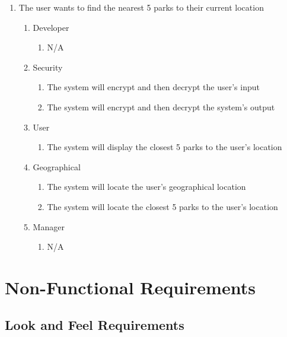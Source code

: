 \documentclass[titlepage]{article}
\begin{document}
\begin{enumerate}[{BE}1.]
    \item The user wants to find the nearest 5 parks to their current location
    \begin{enumerate}[{VP\theenumi}.1]
        \item Developer
            \begin{enumerate}
                \item N/A
            \end{enumerate}
        \item Security
            \begin{enumerate}
                \item The system will encrypt and then decrypt the user's input
                \item The system will encrypt and then decrypt the system's output
            \end{enumerate}
        \item User
            \begin{enumerate}
                \item The system will display the closest 5 parks to the user's location
            \end{enumerate}
        \item Geographical
            \begin{enumerate}
                \item The system will locate the user's geographical location
                \item The system will locate the closest 5 parks to the user's location
            \end{enumerate}
        \item Manager
            \begin{enumerate}
                \item N/A
            \end{enumerate}
    \end{enumerate}


\end{enumerate}

\section{Non-Functional Requirements}
\label{sec:non-functional_requirements}
\subsection{Look and Feel Requirements}
\label{sub:look_and_feel_requirements}
\end{document}
